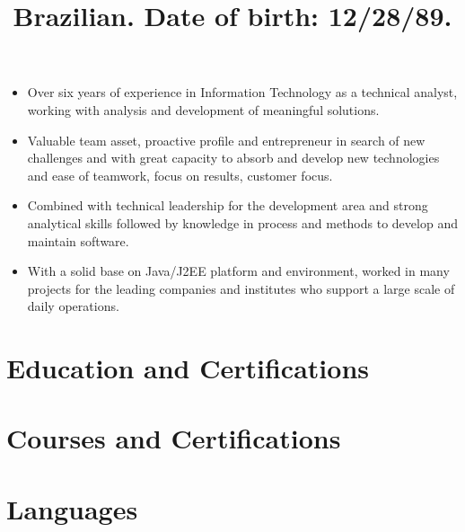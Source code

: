 \documentclass[12pt,a4paper]{moderncv}
\title{\small Brazilian. Date of birth: 12/28/89.}
\begin{document}
\makecvtitle

\begin{itemize}
    \item Over six years of experience in Information Technology as a technical analyst, working with analysis and development of meaningful solutions.
    \item Valuable team asset, proactive profile and entrepreneur in search of new challenges and with great capacity to absorb and develop new technologies and ease of teamwork, focus on results, customer focus.
    \item Combined with technical leadership for the development area and strong analytical skills followed by knowledge in process and methods to develop and maintain software.
    \item With a solid base on Java/J2EE platform and environment, worked in many projects for the leading companies and institutes who support a large scale of daily operations.
\end{itemize}

\section{Education and Certifications}

\section{Courses and Certifications}


\section{Languages}
\end{document}
